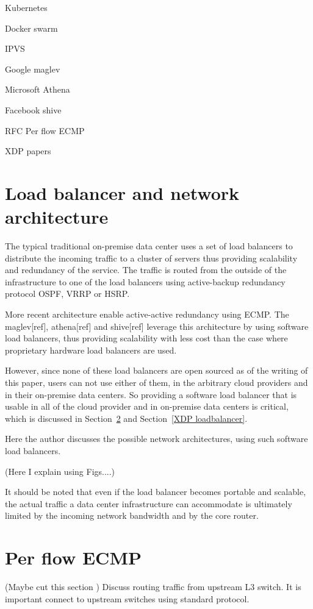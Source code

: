 Kubernetes

Docker swarm

IPVS

Google maglev

Microsoft Athena

Facebook shive

RFC Per flow ECMP  

XDP papers

\section{Load balancer and network architecture}\label{Architecture}
The typical traditional on-premise data center uses a set of load balancers to distribute the incoming traffic to a cluster of servers thus providing scalability and redundancy of the service.
The traffic is routed from the outside of the infrastructure to one of the load balancers using active-backup redundancy protocol OSPF, VRRP or HSRP.

More recent architecture enable active-active redundancy using ECMP. The maglev[ref], athena[ref] and shive[ref] leverage this architecture by using software load balancers, thus providing scalability with less cost than the case where proprietary hardware load balancers are used.

However, since none of these load balancers are open sourced as of the writing of this paper, users can not use either of them, in the arbitrary cloud providers and in their on-premise data centers.
So providing a software load balancer that is usable in all of the cloud provider and in on-premise data centers is critical, which is discussed in Section~\ref{IPVS} and Section~\ref{XDP loadbalancer}.

Here the author discusses the possible network architectures, using such software load balancers.

(Here I explain using Figs....)

It should be noted that even if the load balancer becomes portable and scalable, the actual traffic a data center infrastructure can accommodate is ultimately limited by the incoming network bandwidth and by the core router.

\section{Per flow ECMP}\label{IPVS}
(Maybe cut this section )
Discuss routing traffic from upstream L3 switch. 
It is important connect to upstream switches using standard protocol.

